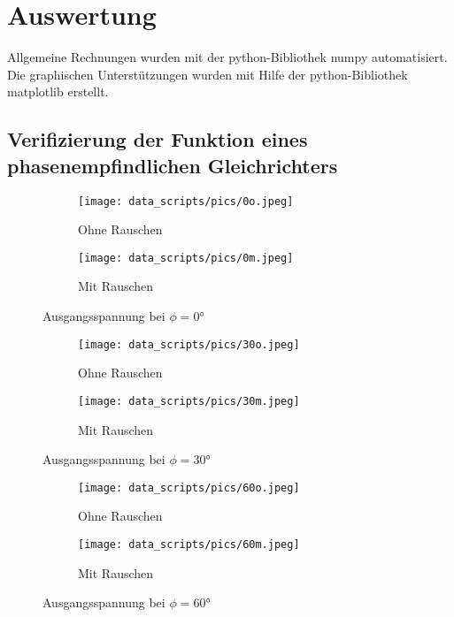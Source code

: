 \section{Auswertung}
\label{sec:Auswertung}
Allgemeine Rechnungen wurden mit der python-Bibliothek numpy \cite{numpy} automatisiert.  
Die graphischen Unterstützungen wurden mit Hilfe der python-Bibliothek matplotlib \cite{matplotlib} erstellt.
\subsection{Verifizierung der Funktion eines phasenempfindlichen Gleichrichters}
\label{sec:phase}
\begin{figure}
    \begin{subfigure}{0.48 \textwidth}
        \centering
        \texttt{[image: data\_scripts/pics/0o.jpeg]}
        \caption{Ohne Rauschen}
    \end{subfigure}
    \hfill
    \begin{subfigure}{0.48 \textwidth}
            \centering
            \texttt{[image: data\_scripts/pics/0m.jpeg]}
            \caption{Mit Rauschen}
    \end{subfigure}
    \caption{Ausgangsspannung bei $\phi = \ang{0;;}$}
\end{figure}
\begin{figure}
    \begin{subfigure}{0.48 \textwidth}
        \centering
        \texttt{[image: data\_scripts/pics/30o.jpeg]}
        \caption{Ohne Rauschen}
    \end{subfigure}
    \hfill
    \begin{subfigure}{0.48 \textwidth}
            \centering
            \texttt{[image: data\_scripts/pics/30m.jpeg]}
            \caption{Mit Rauschen}
    \end{subfigure}
    \caption{Ausgangsspannung bei $\phi = \ang{30;;}$}
\end{figure}
\begin{figure}
    \begin{subfigure}{0.48 \textwidth}
        \centering
        \texttt{[image: data\_scripts/pics/60o.jpeg]}
        \caption{Ohne Rauschen}
    \end{subfigure}
    \hfill
    \begin{subfigure}{0.48 \textwidth}
            \centering
            \texttt{[image: data\_scripts/pics/60m.jpeg]}
            \caption{Mit Rauschen}
    \end{subfigure}
    \caption{Ausgangsspannung bei $\phi = \ang{60;;}$}
\end{figure}
